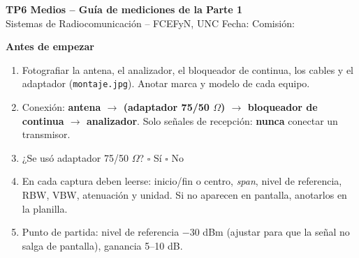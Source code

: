 \documentclass[10pt]{article}
\newcommand{\archivo}[1]{\texttt{\small #1}}
\begin{document}
{\Large\textbf{TP6 Medios -- Guía de mediciones de la Parte 1}}\\[2pt]
Sistemas de Radiocomunicación -- FCEFyN, UNC \hfill Fecha: \underline{\hspace{3cm}} \quad Comisión: \underline{\hspace{2cm}}

\vspace{6pt}
\textbf{Antes de empezar}
\begin{enumerate}
    \item Fotografiar la antena, el analizador, el bloqueador de continua, los cables y el adaptador (\archivo{montaje.jpg}). Anotar marca y modelo de cada equipo.
    \item Conexión: \textbf{antena $\rightarrow$ (adaptador 75/50 $\Omega$) $\rightarrow$ bloqueador de continua $\rightarrow$ analizador}. Solo señales de recepción: \textbf{nunca} conectar un transmisor.
    \item ¿Se usó adaptador 75/50 $\Omega$? \quad $\square$ Sí \quad $\square$ No
    \item En cada captura deben leerse: inicio/fin o centro, \textit{span}, nivel de referencia, RBW, VBW, atenuación y unidad. Si no aparecen en pantalla, anotarlos en la planilla.
    \item Punto de partida: nivel de referencia $-30$ dBm (ajustar para que la señal no salga de pantalla), ganancia 5--10 dB.
\end{enumerate}
\end{document}
